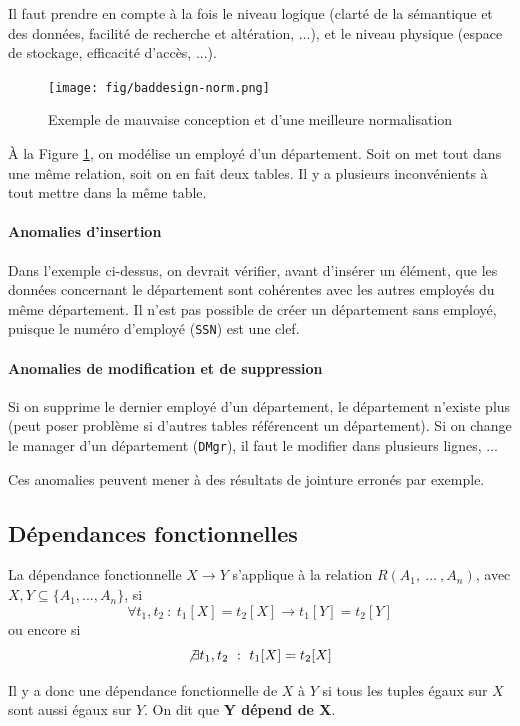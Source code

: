 \documentclass[a4paper]{article}
\begin{document}
Il faut prendre en compte à la fois le niveau logique (clarté de la sémantique et des données,
facilité de recherche et altération, ...), et le niveau physique (espace de stockage, efficacité d'accès, ...).

\begin{figure}[H]
\center
\texttt{[image: fig/baddesign-norm.png]}
\caption{\label{fig:baddesign-norm} Exemple de mauvaise conception et d'une meilleure normalisation}
\end{figure}

\`A la Figure \ref{fig:baddesign-norm}, on modélise un employé d'un département.
Soit on met tout dans une même relation, soit on en fait deux tables. Il y a plusieurs
inconvénients à tout mettre dans la même table.

\paragraph{Anomalies d'insertion}
Dans l'exemple ci-dessus, on devrait vérifier, avant d'insérer un élément, que
les données concernant le département sont cohérentes avec les autres employés
du même département. Il n'est pas possible de créer un département sans employé,
puisque le numéro d'employé (\texttt{SSN}) est une clef.

\paragraph{Anomalies de modification et de suppression}
Si on supprime le dernier employé d'un département, le département n'existe plus
(peut poser problème si d'autres tables référencent un département). Si on change
le manager d'un département (\texttt{DMgr}), il faut le modifier dans plusieurs
lignes, ...

Ces anomalies peuvent mener à des résultats de jointure erronés par exemple.

\subsection{Dépendances fonctionnelles}
La dépendance fonctionnelle $X \rightarrow Y$ s'applique à la relation $R(A_1, ~...~, A_n)$,
avec $X,Y \subseteq \{A_1, ..., A_n\}$, si
$$ \forall t_1,t_2 ~:~ t_1[X] = t_2[X] \rightarrow t_1[Y] = t_2[Y] $$
ou encore si
$$ \not\exists t_1,t_2 ~:~ t_1[X] = t_2[X] $$

Il y a donc une dépendance fonctionnelle de $X$ à $Y$ si tous les tuples égaux
sur $X$ sont aussi égaux sur $Y$. On dit que \textbf{Y dépend de X}.
\end{document}
